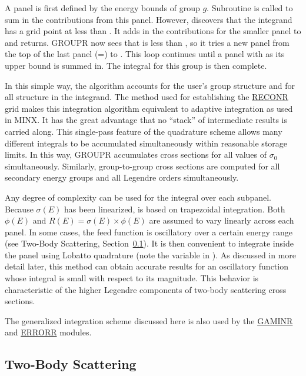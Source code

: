 \noindent
A panel is first defined by the energy bounds of group $g$.  Subroutine
 is called to sum in the contributions from this panel.
However,  discovers that the integrand has a grid point at
 less than .  It adds in the contributions for
the smaller panel  to  and returns.  GROUPR now
sees that  is less than , so it tries a new panel
from the top of the last panel (=) to .
This loop continues until a panel with  as its upper bound
is summed in.  The integral for this group is then complete.

In this simple way, the algorithm accounts for the user's group
structure and for all structure in the integrand.  The method used for
establishing the \hyperlink{sRECONRhy}{RECONR} grid
makes this integration algorithm
equivalent to adaptive integration as used in MINX\cite{MINX}.
It has the great advantage that no ``stack'' of intermediate results
is carried along.  This single-pass feature of the quadrature scheme
allows many different integrals to be accumulated simultaneously
within reasonable storage limits.  In this way, GROUPR accumulates
cross sections for all values of $\sigma_0$ simultaneously.  Similarly,
group-to-group cross sections are computed for all secondary energy
groups and all Legendre orders simultaneously.

Any degree of complexity can be used for the integral over each subpanel.
Because $\sigma(E)$ has been linearized,  is based on
trapezoidal integration.  Both $\phi(E)$ and
$R(E)=\sigma(E){\times}\phi(E)$ are assumed to vary linearly across each
panel.  In some cases, the feed function is oscillatory over a certain
energy range (see Two-Body Scattering, Section~\ref{ssGROUPR_TwoBody}).
It is then convenient to integrate inside the panel using Lobatto
quadrature\cite{ref13} (note the variable
 in ).  As discussed
in more detail later, this method can obtain accurate results
for an oscillatory function whose integral is small with respect to its
magnitude.  This behavior is characteristic of the higher Legendre
components of two-body scattering cross sections.

The generalized integration scheme discussed here is also used by
the \hyperlink{sGAMINRhy}{GAMINR}
and \hyperlink{sERRORRhy}{ERRORR} modules.

\subsection{Two-Body Scattering}
\label{ssGROUPR_TwoBody}

